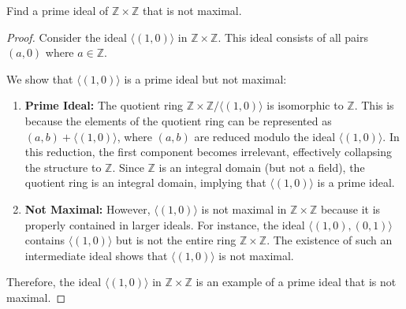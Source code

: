 \documentclass[12pt]{amsart}
\theoremstyle{definition}
\numberwithin{equation}{section}
\theoremstyle{plain}
\newcommand{\Z}{\mathbb{Z}}
\begin{document}
\begin{exercise}{16} Find a prime ideal of $\Z \times \Z$ that is not maximal.
\begin{proof}
Consider the ideal \(\langle(1,0)\rangle\) in \(\mathbb{Z} \times \mathbb{Z}\). This ideal consists of all pairs \((a, 0)\) where \(a \in \mathbb{Z}\).

We show that \(\langle(1,0)\rangle\) is a prime ideal but not maximal:

\begin{enumerate}
    \item \textbf{Prime Ideal:} The quotient ring \(\mathbb{Z} \times \mathbb{Z}/\langle(1,0)\rangle\) is isomorphic to \(\mathbb{Z}\). This is because the elements of the quotient ring can be represented as \((a, b) + \langle(1,0)\rangle\), where \((a, b)\) are reduced modulo the ideal \(\langle(1,0)\rangle\). In this reduction, the first component becomes irrelevant, effectively collapsing the structure to \(\mathbb{Z}\). Since \(\mathbb{Z}\) is an integral domain (but not a field), the quotient ring is an integral domain, implying that \(\langle(1,0)\rangle\) is a prime ideal.

    \item \textbf{Not Maximal:} However, \(\langle(1,0)\rangle\) is not maximal in \(\mathbb{Z} \times \mathbb{Z}\) because it is properly contained in larger ideals. For instance, the ideal \(\langle(1,0), (0,1)\rangle\) contains \(\langle(1,0)\rangle\) but is not the entire ring \(\mathbb{Z} \times \mathbb{Z}\). The existence of such an intermediate ideal shows that \(\langle(1,0)\rangle\) is not maximal.
\end{enumerate}

Therefore, the ideal \(\langle(1,0)\rangle\) in \(\mathbb{Z} \times \mathbb{Z}\) is an example of a prime ideal that is not maximal.
\end{proof}
\end{exercise}
\vspace*{20pt}
\end{document}
